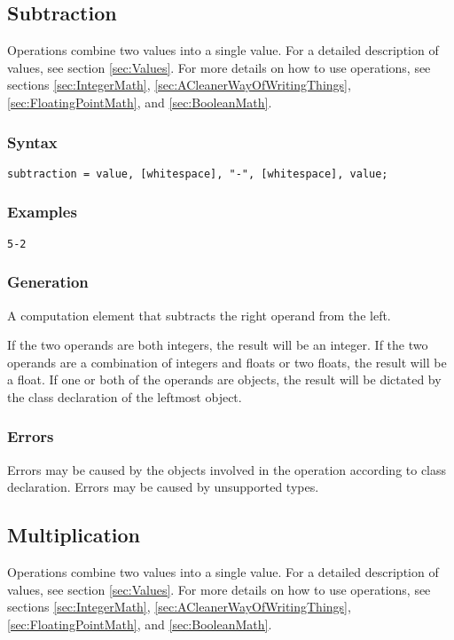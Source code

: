 \documentclass[10pt,a4paper]{article}
\begin{document}
\newpage




\subsection{Subtraction}
Operations combine two values into a single value. For a detailed description of values, see section \ref{sec:Values}. For more details on how to use operations, see sections \ref{sec:IntegerMath}, \ref{sec:ACleanerWayOfWritingThings}, \ref{sec:FloatingPointMath}, and \ref{sec:BooleanMath}.

\subsubsection{Syntax}
\begin{verbatim}
subtraction = value, [whitespace], "-", [whitespace], value;
\end{verbatim}

\subsubsection{Examples}
\begin{verbatim}
5-2
\end{verbatim}

\subsubsection{Generation}
A computation element that subtracts the right operand from the left.

If the two operands are both integers, the result will be an integer. If the two operands are a combination of integers and floats or two floats, the result will be a float. If one or both of the operands are objects, the result will be dictated by the class declaration of the leftmost object.

\subsubsection{Errors}
Errors may be caused by the objects involved in the operation according to class declaration. Errors may be caused by unsupported types.

\newpage




\subsection{Multiplication}
Operations combine two values into a single value. For a detailed description of values, see section \ref{sec:Values}. For more details on how to use operations, see sections \ref{sec:IntegerMath}, \ref{sec:ACleanerWayOfWritingThings}, \ref{sec:FloatingPointMath}, and \ref{sec:BooleanMath}.
\end{document}
